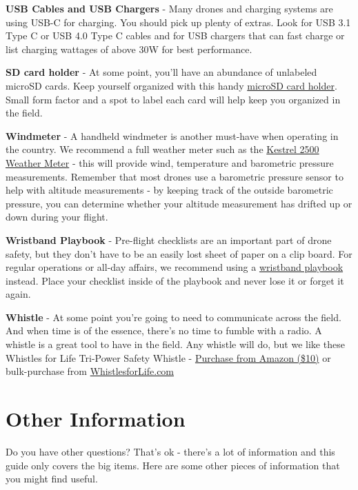 \documentclass[
  12pt,
]{book}
\begin{document}
\textbf{USB Cables and USB Chargers} - Many drones and charging systems are using USB-C for charging. You should pick up plenty of extras. Look for USB 3.1 Type C or USB 4.0 Type C cables and for USB chargers that can fast charge or list charging wattages of above 30W for best performance.

\textbf{SD card holder} - At some point, you'll have an abundance of unlabeled microSD cards. Keep yourself organized with this handy \href{https://www.amazon.com/Holder-Storage-Organizer-Lightweight-Portable/dp/B07T6SWXK5/}{microSD card holder}. Small form factor and a spot to label each card will help keep you organized in the field.

\textbf{Windmeter} - A handheld windmeter is another must-have when operating in the country. We recommend a full weather meter such as the \href{https://kestrelmeters.com/collections/all-kestrel-meters/products/kestrel-2500-weather-meter}{Kestrel 2500 Weather Meter} - this will provide wind, temperature and barometric pressure measurements. Remember that most drones use a barometric pressure sensor to help with altitude measurements - by keeping track of the outside barometric pressure, you can determine whether your altitude measurement has drifted up or down during your flight.

\textbf{Wristband Playbook} - Pre-flight checklists are an important part of drone safety, but they don't have to be an easily lost sheet of paper on a clip board. For regular operations or all-day affairs, we recommend using a \href{https://www.amazon.com/dp/B01DJJW8QW}{wristband playbook} instead. Place your checklist inside of the playbook and never lose it or forget it again.

\textbf{Whistle} - At some point you're going to need to communicate across the field. And when time is of the essence, there's no time to fumble with a radio. A whistle is a great tool to have in the field. Any whistle will do, but we like these Whistles for Life Tri-Power Safety Whistle - \href{https://www.amazon.com/Whistles-Life-Tri-Power-Whistle-Snorkelers/dp/B004RRZIUO/}{Purchase from Amazon (\$10)} or bulk-purchase from \href{https://whistlesforlife.com/}{WhistlesforLife.com}

\chapter{Other Information}\label{other-information}

Do you have other questions? That's ok - there's a lot of information and this guide only covers the big items. Here are some other pieces of information that you might find useful.
\end{document}
